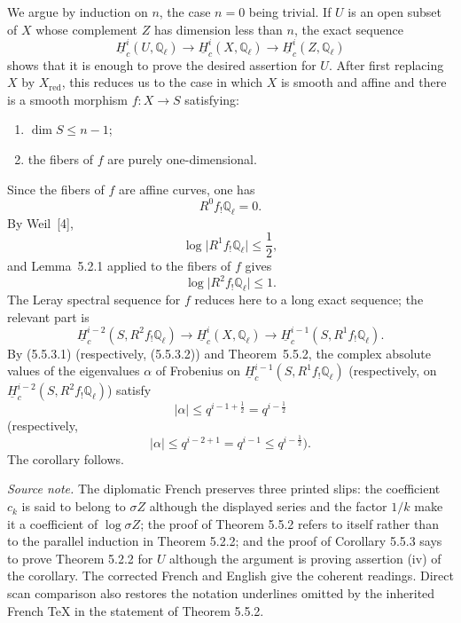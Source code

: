 We argue by induction on $n$, the case $n=0$ being trivial.  If $U$ is an
open subset of $X$ whose complement $Z$ has dimension less than $n$, the
exact sequence
\[
\underline H_c^i(U,\mathbb Q_\ell)\longrightarrow
\underline H_c^i(X,\mathbb Q_\ell)\longrightarrow
\underline H_c^i(Z,\mathbb Q_\ell)
\]
shows that it is enough to prove the desired assertion for $U$.  After
first replacing $X$ by $X_{\mathrm{red}}$, this reduces us to the case in
which $X$ is smooth and affine and there is a smooth morphism
$f:X\longrightarrow S$ satisfying:
\begin{enumerate}[label=(\alph*)]
\item $\dim S\leq n-1$;
\item the fibers of $f$ are purely one-dimensional.
\end{enumerate}
Since the fibers of $f$ are affine curves, one has
\[
R^0f_!\mathbb Q_\ell=0.
\]
By Weil~[4],
\begin{equation}\tag{5.5.3.1}
\log\bigl|R^1f_!\mathbb Q_\ell\bigr|\leq\frac12,
\end{equation}
and Lemma~5.2.1 applied to the fibers of $f$ gives
\begin{equation}\tag{5.5.3.2}
\log\bigl|R^2f_!\mathbb Q_\ell\bigr|\leq1.
\end{equation}
The Leray spectral sequence for $f$ reduces here to a long exact sequence;
the relevant part is
\[
\underline H_c^{i-2}(S,R^2f_!\mathbb Q_\ell)\longrightarrow
\underline H_c^i(X,\mathbb Q_\ell)\longrightarrow
\underline H_c^{i-1}(S,R^1f_!\mathbb Q_\ell).
\]
By (5.5.3.1) (respectively, (5.5.3.2)) and Theorem~5.5.2, the complex
absolute values of the eigenvalues $\alpha$ of Frobenius on
$\underline H_c^{i-1}(S,R^1f_!\mathbb Q_\ell)$ (respectively, on
$\underline H_c^{i-2}(S,R^2f_!\mathbb Q_\ell)$) satisfy
\[
|\alpha|\leq q^{i-1+\frac12}=q^{i-\frac12}
\]
(respectively,
\[
|\alpha|\leq q^{i-2+1}=q^{i-1}\leq q^{i-\frac12}).
\]
The corollary follows.

\medskip
\noindent\emph{Source note.}
The diplomatic French preserves three printed slips: the coefficient
$c_k$ is said to belong to $\sigma Z$ although the displayed series and
the factor $1/k$ make it a coefficient of $\log\sigma Z$; the proof of
Theorem 5.5.2 refers to itself rather than to the parallel induction in
Theorem 5.2.2; and the proof of Corollary 5.5.3 says to prove Theorem 5.2.2
for $U$ although the argument is proving assertion (iv) of the corollary.
The corrected French and English give the coherent readings.  Direct scan
comparison also restores the notation underlines omitted by the inherited
French TeX in the statement of Theorem 5.5.2.
